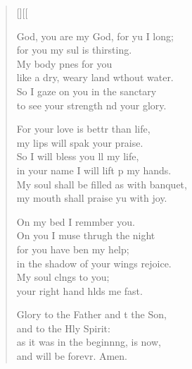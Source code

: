 \settowidth{\versewidth}{My soul shall be filled as with a banquet, *}
\begin{verse}[\versewidth][\versewidth[
  \begin{patverse}
     God, you are my God, for yu I long;\Med\\
for you my sul is thirsting.\\
My body p\pointup{\i}nes for you\Med\\
like a dry, weary land wthout water.\\
So I gaze on you in the sanctary\Med\\
to see your strength nd your glory.

For your love is bettr than life,\Med\\
my lips will spak your praise.\\
So I will bless you ll my life,\Med\\
in your name I will lift p my hands.\\
My soul shall be filled as with  banquet,\Med\\
my mouth shall praise yu with joy.

On my bed I remmber you.\Med\\
On you I muse thrugh the night\\
for you have ben my help;\Med\\
in the shadow of your wings  rejoice.\\
My soul cl\pointup{\i}ngs to you;\Med\\
your right hand hlds me fast.

Glory to the Father and t the Son,\Med\\
and to the Hly Spirit:\\
as it was in the beginn\pointup{\i}ng, is now,\Med\\
and will be forevr. Amen.
  \end{patverse}
\end{verse}

